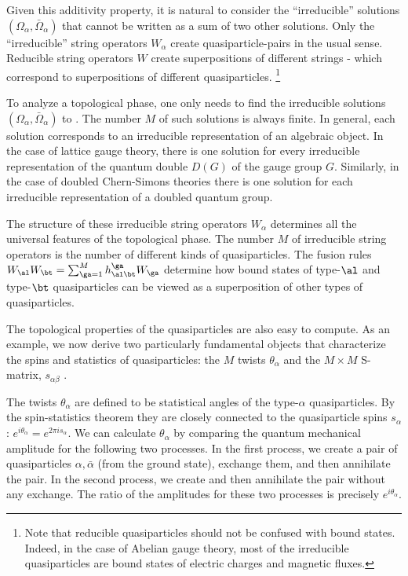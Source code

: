 \documentclass[aps,twocolumn,groupedaddress,showpacs,floatfix]{revtex4}
\begin{document}
Given this additivity property, it is natural to consider the ``irreducible'' 
solutions $(\Omega_{\alpha}, \bar{\Omega}_{\alpha})$ that cannot be written as 
a sum of two other solutions. Only the ``irreducible'' string operators 
$W_{\alpha}$ create quasiparticle-pairs in the usual sense. Reducible string 
operators $W$ create superpositions of different strings - which correspond to 
superpositions of different quasiparticles. \footnote{Note that reducible 
quasiparticles should not be confused with bound states. Indeed, in the case of
Abelian gauge theory, most of the irreducible quasiparticles are bound states 
of electric charges and magnetic fluxes.}

To analyze a topological phase, one only needs to find the irreducible
solutions $(\Omega_{\alpha},\bar{\Omega}_{\alpha})$ to . The number
$M$ of such solutions is always finite. In general, each solution corresponds 
to an irreducible representation of an algebraic object. In the case of lattice
gauge theory, there is one solution for every irreducible representation of the
quantum double $D(G)$ of the gauge group $G$. Similarly, in the case of doubled
Chern-Simons theories there is one solution for each irreducible representation
of a doubled quantum group. 

The structure of these irreducible string operators $W_\alpha$ determines all
the universal features of the topological phase. The number $M$ of
irreducible string operators is the number of different kinds of
quasiparticles. The fusion rules $W_\al W_\bt=\sum_{\ga=1}^M h_{\al\bt}^\ga
W_\ga$ determine how bound states of type-$\al$ and type-$\bt$
quasiparticles can be viewed as a superposition of other types of
quasiparticles. 

The topological properties of the quasiparticles are also easy to
compute. As an example, we now derive two particularly fundamental objects 
that characterize the spins and statistics of quasiparticles: the $M$
twists $\theta_{\alpha}$ and the $M \times M$ S-matrix, $s_{\alpha\beta}$
\cite{V8860,W8951,W8929,Wrig}. 

The twists $\theta_{\alpha}$ are defined to be statistical angles of the
type-$\alpha$ quasiparticles. By the spin-statistics theorem they are closely
connected to the quasiparticle spins $s_\alpha$: $e^{i\theta_{\alpha}} =
e^{2\pi i s_{\alpha}}$. We can calculate $\theta_{\alpha}$ by comparing the 
quantum mechanical amplitude for the following two processes. In the first 
process, we create a pair of quasiparticles $\alpha, \bar{\alpha}$ (from the 
ground state), exchange them, and then annihilate the pair. In the second 
process, we create and then annihilate the pair without any exchange. The ratio
of the amplitudes for these two processes is precisely $e^{i\theta_{\alpha}}$.
\end{document}
